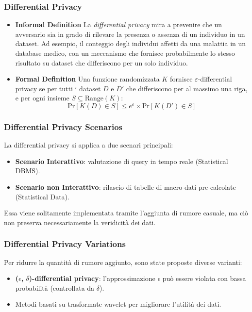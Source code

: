 \documentclass{report}
\begin{document}
\subsubsection{ Differential Privacy}
\begin{itemize}
    \item \textbf{Informal Definition}
    La \textit{differential privacy} mira a prevenire che un avversario sia in grado di rilevare la presenza o assenza di un individuo in un dataset. 
    Ad esempio, il conteggio degli individui affetti da una malattia in un database medico, con un meccanismo che fornisce probabilmente lo stesso risultato su dataset che differiscono per un solo individuo.
    \item \textbf{Formal Definition}
    Una funzione randomizzata $K$ fornisce $\varepsilon$-differential privacy se per tutti i dataset $D$ e $D'$ che differiscono per al massimo una riga, e per ogni insieme $S \subseteq \text{Range}(K)$:
    \[
    \text{Pr}[K(D) \in S] \leq e^{\varepsilon} \times \text{Pr}[K(D') \in S]
    \]
\end{itemize}


\subsubsection{ Differential Privacy Scenarios}
La differential privacy si applica a due scenari principali:
\begin{itemize}
    \item \textbf{Scenario Interattivo}: valutazione di query in tempo reale (Statistical DBMS).
    \item \textbf{Scenario non Interattivo}: rilascio di tabelle di macro-dati pre-calcolate (Statistical Data).
\end{itemize}
Essa viene solitamente implementata tramite l'aggiunta di rumore casuale, ma ciò non preserva necessariamente la veridicità dei dati.

\subsubsection{ Differential Privacy Variations}
Per ridurre la quantità di rumore aggiunto, sono state proposte diverse varianti:
\begin{itemize}
    \item \textbf{($\epsilon$, $\delta$)-differential privacy}: l'approssimazione $\epsilon$ può essere violata con bassa probabilità (controllata da $\delta$).
    \item Metodi basati su trasformate wavelet per migliorare l'utilità dei dati.
\end{itemize}
\end{document}
